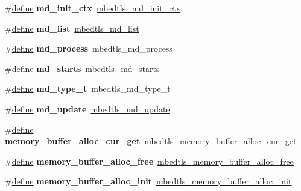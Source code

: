\begin{DoxyCompactItemize}
\#\hyperlink{structdefine}{define} {\bfseries md\+\_\+init\+\_\+ctx}~\hyperlink{md_8h_a40d6e9a8c2ee4d9c24782d4dd6fc7c36}{mbedtls\+\_\+md\+\_\+init\+\_\+ctx}
\item 
\mbox{\label{compat-1_83_8h_aacbc1cecba17c269fed4d6697d55c073}} 
\#\hyperlink{structdefine}{define} {\bfseries md\+\_\+list}~\hyperlink{md_8h_a51dc7cc39a5bf5b894cc1616bf798c06}{mbedtls\+\_\+md\+\_\+list}
\item 
\mbox{\label{compat-1_83_8h_aa182d7399b8276cd0ba1bdef85277a4b}} 
\#\hyperlink{structdefine}{define} {\bfseries md\+\_\+process}~mbedtls\+\_\+md\+\_\+process
\item 
\mbox{\label{compat-1_83_8h_ae9bb3b39d35cf40c77c03d27152bf8dd}} 
\#\hyperlink{structdefine}{define} {\bfseries md\+\_\+starts}~\hyperlink{md_8h_a24483eff556810e3489ac6abefa328e6}{mbedtls\+\_\+md\+\_\+starts}
\item 
\mbox{\label{compat-1_83_8h_afa7a86119f85b1cefeb635f2fcc551fb}} 
\#\hyperlink{structdefine}{define} {\bfseries md\+\_\+type\+\_\+t}~mbedtls\+\_\+md\+\_\+type\+\_\+t
\item 
\mbox{\label{compat-1_83_8h_af4dca3fa01757d34badc7fea8c71e49e}} 
\#\hyperlink{structdefine}{define} {\bfseries md\+\_\+update}~\hyperlink{md_8h_a7e50ce3a8c75b5221d07be657b93ca94}{mbedtls\+\_\+md\+\_\+update}
\item 
\mbox{\label{compat-1_83_8h_af4d923d718baa32ddc050ad1791b8b08}} 
\#\hyperlink{structdefine}{define} {\bfseries memory\+\_\+buffer\+\_\+alloc\+\_\+cur\+\_\+get}~mbedtls\+\_\+memory\+\_\+buffer\+\_\+alloc\+\_\+cur\+\_\+get
\item 
\mbox{\label{compat-1_83_8h_a0d092e2c1c12ef0c55b05fb8af4eac39}} 
\#\hyperlink{structdefine}{define} {\bfseries memory\+\_\+buffer\+\_\+alloc\+\_\+free}~\hyperlink{memory__buffer__alloc_8h_ae9d7316a19b72776f34ba74720a06325}{mbedtls\+\_\+memory\+\_\+buffer\+\_\+alloc\+\_\+free}
\item 
\mbox{\label{compat-1_83_8h_a43294dc7f2f1defa819952ba59f7e980}} 
\#\hyperlink{structdefine}{define} {\bfseries memory\+\_\+buffer\+\_\+alloc\+\_\+init}~\hyperlink{memory__buffer__alloc_8h_ac70d134be54133c272d8eab2cb85dfbf}{mbedtls\+\_\+memory\+\_\+buffer\+\_\+alloc\+\_\+init}

\end{DoxyCompactItemize}
